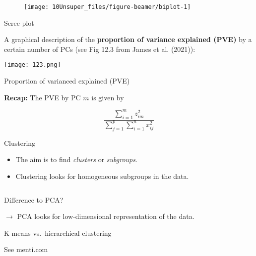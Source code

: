 \documentclass[
  10pt,
  ignorenonframetext,
]{beamer}
\begin{document}
\begin{frame}
\begin{figure}
\texttt{[image: 10Unsuper\_files/figure-beamer/biplot-1]} \end{figure}
\end{frame}

\begin{frame}
\begin{block}{Scree plot}
\protect\hypertarget{scree-plot}{}
\(~\)

A graphical description of the \textbf{proportion of variance explained
(PVE)} by a certain number of PCs (see Fig 12.3 from James et al.
(2021)):

\centering

\texttt{[image: 123.png]}
\end{block}
\end{frame}

\begin{frame}
\begin{block}{Proportion of varianced explained (PVE)}
\protect\hypertarget{proportion-of-varianced-explained-pve}{}
\(~\)

\textbf{Recap:} The PVE by PC \(m\) is given by

\[
\frac{\sum_{i=1}^m z_{im}^2} {\sum_{j=1}^p\sum_{i=1}^n x_{ij}^2}
\]
\end{block}
\end{frame}

\begin{frame}{Clustering}
\protect\hypertarget{clustering}{}
\(~\)

\begin{itemize}
\item
  The aim is to find \emph{clusters} or \emph{subgroups}.
\item
  Clustering looks for homogeneous subgroups in the data.
\end{itemize}

\(~\)

Difference to PCA?

\pause

\(\rightarrow\) PCA looks for low-dimensional representation of the
data.
\end{frame}

\begin{frame}
\begin{block}{K-means vs.~hierarchical clustering}
\protect\hypertarget{k-means-vs.-hierarchical-clustering}{}
\(~\)

See menti.com
\end{block}
\end{frame}
\end{document}
